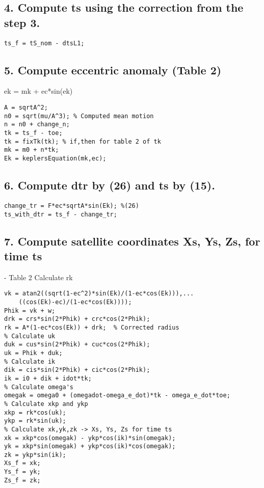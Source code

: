 \subsection*{4. Compute ts using the correction from the step 3.}

\begin{verbatim}
ts_f = tS_nom - dtsL1;
\end{verbatim}


\subsection*{5. Compute eccentric anomaly (Table 2)}

\begin{par}
ek = mk + ec*sin(ek)
\end{par} \vspace{1em}
\begin{verbatim}
A = sqrtA^2;
n0 = sqrt(mu/A^3); % Computed mean motion
n = n0 + change_n;
tk = ts_f - toe;
tk = fixTk(tk); % if,then for table 2 of tk
mk = m0 + n*tk;
Ek = keplersEquation(mk,ec);
\end{verbatim}


\subsection*{6. Compute dtr by (26) and ts by (15).}

\begin{verbatim}
change_tr = F*ec*sqrtA*sin(Ek); %(26)
ts_with_dtr = ts_f - change_tr;
\end{verbatim}


\subsection*{7. Compute satellite coordinates Xs, Ys, Zs, for time ts}

\begin{par}
- Table 2 Calculate rk
\end{par} \vspace{1em}
\begin{verbatim}
vk = atan2((sqrt(1-ec^2)*sin(Ek)/(1-ec*cos(Ek))),...
    ((cos(Ek)-ec)/(1-ec*cos(Ek))));
Phik = vk + w;
drk = crs*sin(2*Phik) + crc*cos(2*Phik);
rk = A*(1-ec*cos(Ek)) + drk;  % Corrected radius
% Calculate uk
duk = cus*sin(2*Phik) + cuc*cos(2*Phik);
uk = Phik + duk;
% Calculate ik
dik = cis*sin(2*Phik) + cic*cos(2*Phik);
ik = i0 + dik + idot*tk;
% Calculate omega's
omegak = omega0 + (omegadot-omega_e_dot)*tk - omega_e_dot*toe;
% Calculate xkp and ykp
xkp = rk*cos(uk);
ykp = rk*sin(uk);
% Calculate xk,yk,zk -> Xs, Ys, Zs for time ts
xk = xkp*cos(omegak) - ykp*cos(ik)*sin(omegak);
yk = xkp*sin(omegak) + ykp*cos(ik)*cos(omegak);
zk = ykp*sin(ik);
Xs_f = xk;
Ys_f = yk;
Zs_f = zk;
\end{verbatim}


